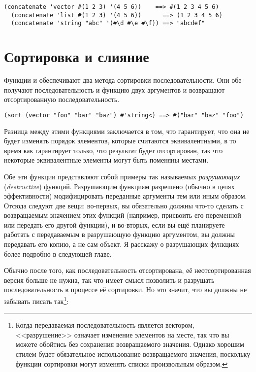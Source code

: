 \begin{lstlisting}[style=lisprepl]
  (concatenate 'vector #(1 2 3) '(4 5 6))    ==> #(1 2 3 4 5 6)
  (concatenate 'list #(1 2 3) '(4 5 6))      ==> (1 2 3 4 5 6)
  (concatenate 'string "abc" '(#\d #\e #\f)) ==> "abcdef"
\end{lstlisting}

\section{Сортировка и слияние}

Функции  и  обеспечивают два метода сортировки
последовательности.  Они обе получают последовательность и функцию двух аргументов и
возвращают отсортированную последовательность.

\begin{lstlisting}[style=lisprepl]
  (sort (vector "foo" "bar" "baz") #'string<) ==> #("bar" "baz" "foo")
\end{lstlisting}

Разница между этими функциями заключается в том, что  гарантирует, что
она не будет изменять порядок элементов, которые считаются эквивалентными, в то время как
 гарантирует только, что результат будет отсортирован, так что некоторые
эквивалентные элементы могут быть поменяны местами.

Обе эти функции представляют собой примеры так называемых \textit{разрушающих} (\textit{destructive}) функций.  Разрушающим
функциям разрешено (обычно в целях эффективности) модифицировать переданные аргументы тем
или иным образом.  Отсюда следуют две вещи: во-первых, вы обязательно должны что-то сделать с
возвращаемым значением этих функций (например, присвоить его переменной или передать его
другой функции), и во-вторых, если вы ещё планируете работать с передаваемым в
разрушающую функцию аргументом, вы должны передавать его копию, а не сам объект.
Я расскажу о разрушающих функциях более подробно в следующей главе.

Обычно после того, как последовательность отсортирована, её неотсортированная версия
больше не нужна, так что имеет смысл
позволить  и  разрушать последовательность в процессе её
сортировки.  Но это значит, что вы должны не забывать писать так\footnote{Когда
  передаваемая последовательность является вектором, <<разрушение>> означает изменение
  элементов на месте, так что вы можете обойтись без сохранения возвращаемого значения.
  Однако хорошим стилем будет обязательное использование возвращаемого значения,
  поскольку функции сортировки могут изменять списки произвольным образом.}:

